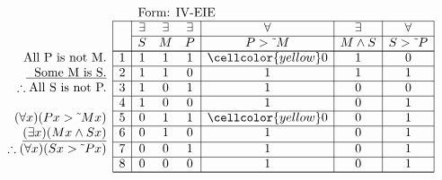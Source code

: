 \documentclass[10pt,legalpaper,landscape,cmtt]{article}
\begin{document}
{\begin{minipage}[t]{3.25in}
	\(
	\begin{array}{r|c|ccc|c|c|c|}
		\multicolumn{2}{c}{}&\multicolumn{6}{l}{\mbox{Form: IV-EIE}} \\ \cline{2-8}
		\hspace{1in}	&	& \exists & \exists & \exists & \forall & \exists & \forall\\ \cline{3-8}
		&	& S & M & P &  P > \tilde~M  &  M \wedge S  &  S > \tilde~P \\ \cline{2-8} \cline{2-8}
		\phantom{\therefore}\mbox{All P is not M.}   & 1 & 1 & 1 & 1 &   \cellcolor{yellow} 0   &   1   &   0  \\ \cline{2-8}
		\underline{\phantom{\therefore}\mbox{Some M is S.}}   & 2 & 1 & 1 & 0 &   1   &   1   &   1  \\ \cline{2-8}
		\therefore \mbox{All S is not P.}   & 3 & 1 & 0 & 1 &   1   &   0   &   0  \\ \cline{2-8}
		& 4 & 1 & 0 & 0 &   1   &   0   &   1  \\ \cline{2-8}
		(\forall x)(Px > \tilde~Mx)   & 5 & 0 & 1 & 1 &   \cellcolor{yellow} 0   &   0   &   1  \\ \cline{2-8}
		\underline{(\exists x)(Mx \wedge Sx)}   & 6 & 0 & 1 & 0 &   1   &   0   &   1  \\ \cline{2-8}
		\therefore(\forall x)(Sx > \tilde~Px)   & 7 & 0 & 0 & 1 &   1   &   0   &   1  \\ \cline{2-8}
		& 8 & 0 & 0 & 0 &   1   &   0   &   1   \\ \cline{2-8}\cline{2-8} 
	\end{array}
	\)
\end{minipage}

}
\end{document}
